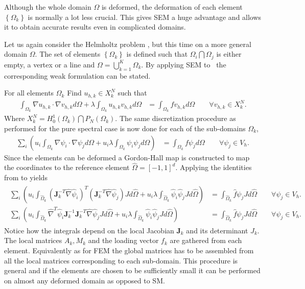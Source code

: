 Although the whole domain $\Omega$ is deformed, the deformation of each
element $\left\{ \Omega_k \right\}$ is normally a lot less crucial. This gives SEM a huge advantage and allows it to 
obtain accurate results even in complicated domains.

Let us again consider the Helmholtz problem , but this time 
on a more general domain $\Omega$. The set of elements $\left\{ \Omega_k \right\}$
is defined such that $\Omega_i\bigcap\Omega_j$ is either empty, a vertex or a line and 
$\Omega = \bigcup^K_{k=1}\Omega_k$.
By applying SEM to~ the corresponding weak formulation can be stated.

For all elements $\Omega_k$ Find $u_{h,k}\in X^N_k$  such that
%
\begin{align}
    \int_{\Omega_k}\nabla u_{h,k} \cdot \nabla v_{h,k} d \Omega
    + \lambda \int_{\Omega_k} u_{h,k} v_{h,k} d \Omega 
    &= \int_{\Omega_k}f v_{h,k}d \Omega \qquad \forall v_{h,k} \in X_k^N.
    \label{eq:HelmholtzweakSEM}
\end{align}
%
Where $X^N_k =  H_0^1(\Omega_k)\bigcap P_N(\Omega_k)$. The same discretization 
procedure as performed for the pure spectral case is now done for each of the 
sub-domains $\Omega_k$,
%
\begin{align}
    \sum_i\left(  u_i\int_{\Omega_k}\nabla \psi_i \cdot \nabla \psi_j d \Omega + 
    u_i\lambda \int_{\Omega_k} \psi_i \psi_jd \Omega \right)
    &= \int_{\Omega_k}f \psi_jd \Omega \qquad \forall \psi_j \in V_h.
    \label{eq:HelmholtzdiscreteSEM}
\end{align}
%
Since the elements can be deformed a Gordon-Hall map is 
constructed to map the coordinates to the reference element $\hat{\Omega}=[-1,1]^d$.
Applying the identities from  to  yields
%
\begin{align}
    \begin{split}
    \sum_i\left(  u_i\int_{\hat{\Omega}_k}(\mathbf{J}_k^{-T}\hat{\nabla} \hat{\psi}_i)^T
    (\mathbf{J}_k^{-T}\hat{\nabla} \hat{\psi}_j) J d \hat{\Omega} + 
    u_i\lambda \int_{\hat{\Omega}_k} \hat{\psi}_i \hat{\psi}_j Jd \hat{\Omega} \right)
    &= \int_{\hat{\Omega}_k}\hat{f} \psi_j J d \hat{\Omega} \qquad \forall \psi_j \in V_h.  \\
    \sum_i\left(  u_i\int_{\hat{\Omega}_k}\hat{\nabla}^T \hat{\psi}_i\mathbf{J}_k^{-1}
    \mathbf{J}_k^{-T}\hat{\nabla} \hat{\psi}_j J d \hat{\Omega} + 
    u_i\lambda \int_{\hat{\Omega}_k} \hat{\psi}_i \hat{\psi}_j Jd \hat{\Omega} \right)
    &= \int_{\hat{\Omega}_k}\hat{f} \psi_j J d \hat{\Omega} \qquad \forall \psi_j \in V_h.
    \end{split}
    \label{eq:HelmholtzrefSEM}
\end{align}
%
Notice how the integrals depend on the local Jacobian $\mathbf{J}_k$ and its determinant $J_k$.
The local matrices $A_k,M_k$ and the loading vector $f_k$ are gathered from each element.
Equivalently as for FEM the global matrices has to be assembled
from all the local matrices corresponding to each sub-domain. This procedure is general and 
if the elements are chosen to be sufficiently small it can 
be performed on almost any deformed domain as opposed to SM. 

